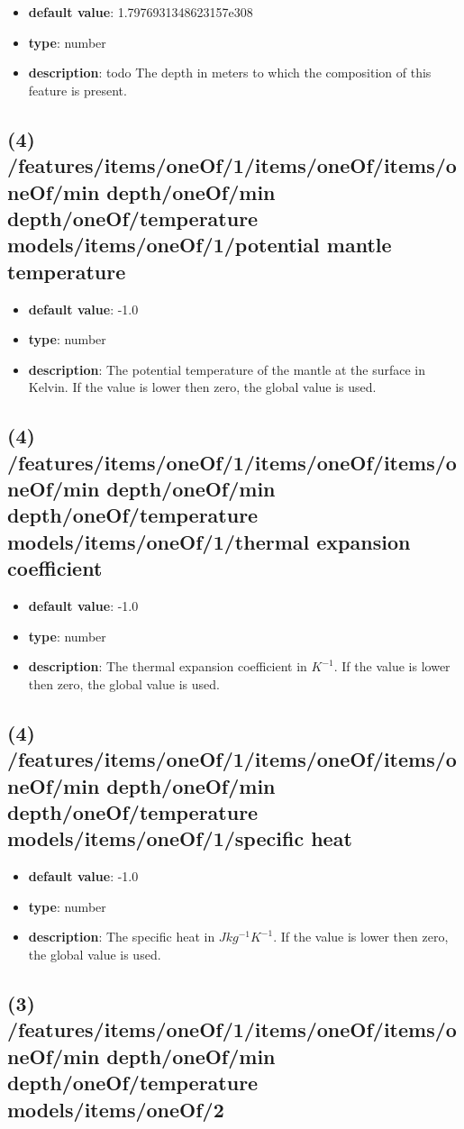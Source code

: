 \begin{itemize}[leftmargin=4em]\item {\bf default value}: 1.7976931348623157e308
\item {\bf type}: number
\item {\bf description}: todo The depth in meters to which the composition of this feature is present.
\end{itemize}\subsection{(4) /features/items/oneOf/1/items/oneOf/items/oneOf/min depth/oneOf/min depth/oneOf/temperature models/items/oneOf/1/potential mantle temperature}
\begin{itemize}[leftmargin=4em]\item {\bf default value}: -1.0
\item {\bf type}: number
\item {\bf description}: The potential temperature of the mantle at the surface in Kelvin. If the value is lower then zero, the global value is used.
\end{itemize}\subsection{(4) /features/items/oneOf/1/items/oneOf/items/oneOf/min depth/oneOf/min depth/oneOf/temperature models/items/oneOf/1/thermal expansion coefficient}
\begin{itemize}[leftmargin=4em]\item {\bf default value}: -1.0
\item {\bf type}: number
\item {\bf description}: The thermal expansion coefficient in $K^{-1}$. If the value is lower then zero, the global value is used.
\end{itemize}\subsection{(4) /features/items/oneOf/1/items/oneOf/items/oneOf/min depth/oneOf/min depth/oneOf/temperature models/items/oneOf/1/specific heat}
\begin{itemize}[leftmargin=4em]\item {\bf default value}: -1.0
\item {\bf type}: number
\item {\bf description}: The specific heat in $J kg^{-1} K^{-1}$. If the value is lower then zero, the global value is used.
\end{itemize}\subsection{(3) /features/items/oneOf/1/items/oneOf/items/oneOf/min depth/oneOf/min depth/oneOf/temperature models/items/oneOf/2}
